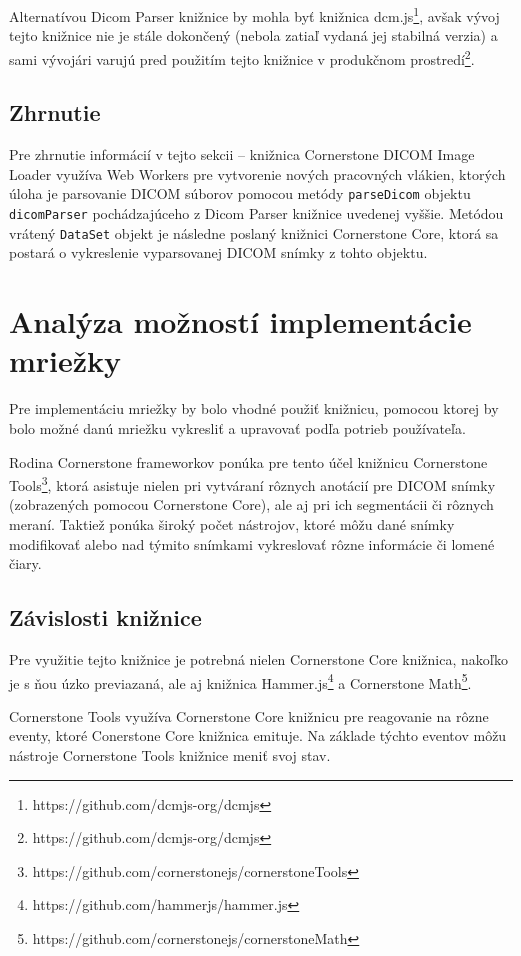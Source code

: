 Alternatívou Dicom Parser knižnice by mohla byť knižnica dcm.js\footnote{https://github.com/dcmjs-org/dcmjs}, avšak vývoj tejto knižnice nie je stále dokončený (nebola zatiaľ vydaná jej stabilná verzia) a sami vývojári varujú pred použitím tejto knižnice v produkčnom prostredí\footnote{https://github.com/dcmjs-org/dcmjs}.

\subsection {Zhrnutie}
Pre zhrnutie informácií v tejto sekcii -- knižnica Cornerstone DICOM Image Loader využíva Web Workers pre vytvorenie nových pracovných vlákien, ktorých úloha je parsovanie DICOM súborov pomocou metódy \texttt{parseDicom} objektu \texttt{dicomParser} pochádzajúceho z Dicom Parser knižnice uvedenej vyššie. Metódou vrátený \texttt{DataSet} objekt je následne poslaný knižnici Cornerstone Core, ktorá sa postará o vykreslenie vyparsovanej DICOM snímky z tohto objektu.

\section {Analýza možností implementácie mriežky}
Pre implementáciu mriežky by bolo vhodné použiť knižnicu, pomocou ktorej by bolo možné danú mriežku vykresliť a upravovať podľa potrieb používateľa.

Rodina Cornerstone frameworkov ponúka pre tento účel knižnicu Cornerstone Tools\footnote{https://github.com/cornerstonejs/cornerstoneTools}, ktorá asistuje nielen pri vytváraní rôznych anotácií pre DICOM snímky (zobrazených pomocou Cornerstone Core), ale aj pri ich segmentácii či rôznych meraní. Taktiež ponúka široký počet nástrojov, ktoré môžu dané snímky modifikovať alebo nad týmito snímkami vykreslovať rôzne informácie či lomené čiary.

\subsection {Závislosti knižnice}
Pre využitie tejto knižnice je potrebná nielen Cornerstone Core knižnica, nakoľko je s ňou úzko previazaná, ale aj knižnica Hammer.js\footnote{https://github.com/hammerjs/hammer.js} a Cornerstone Math\footnote{https://github.com/cornerstonejs/cornerstoneMath}.

Cornerstone Tools využíva Cornerstone Core knižnicu pre reagovanie na rôzne eventy, ktoré Conerstone Core knižnica emituje. Na základe týchto eventov môžu nástroje Cornerstone Tools knižnice meniť svoj stav.

